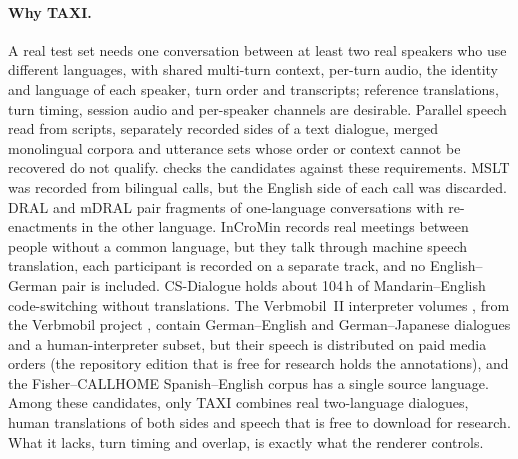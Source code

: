 \paragraph{Why TAXI.}
A real \task test set needs one conversation between at least two real speakers who use different languages, with shared multi-turn context, per-turn audio, the identity and language of each speaker, turn order and transcripts; reference translations, turn timing, session audio and per-speaker channels are desirable. Parallel speech read from scripts, separately recorded sides of a text dialogue, merged monolingual corpora and utterance sets whose order or context cannot be recovered do not qualify.  checks the candidates against these requirements. MSLT \citep{federmann2016microsoft,federmann2017microsoft} was recorded from bilingual calls, but the English side of each call was discarded. DRAL \citep{ward2023dialogs,ward2024dialogs,avila2023towards} and mDRAL \citep{seamless2023seamless} pair fragments of one-language conversations with re-enactments in the other language. InCroMin \citep{cechovic2025corpus} records real meetings between people without a common language, but they talk through machine speech translation, each participant is recorded on a separate track, and no English--German pair is included. CS-Dialogue \citep{zhou2025csdialogue} holds about 104\,h of Mandarin--English code-switching without translations. The Verbmobil~II interpreter volumes \citep{bas2000verbmobil2}, from the Verbmobil project \citep{wahlster2000verbmobil}, contain German--English and German--Japanese dialogues and a human-interpreter subset, but their speech is distributed on paid media orders (the repository edition that is free for research holds the annotations), and the Fisher--CALLHOME Spanish--English corpus \citep{post2013improved} has a single source language. Among these candidates, only TAXI combines real two-language dialogues, human translations of both sides and speech that is free to download for research. What it lacks, turn timing and overlap, is exactly what the renderer controls.


